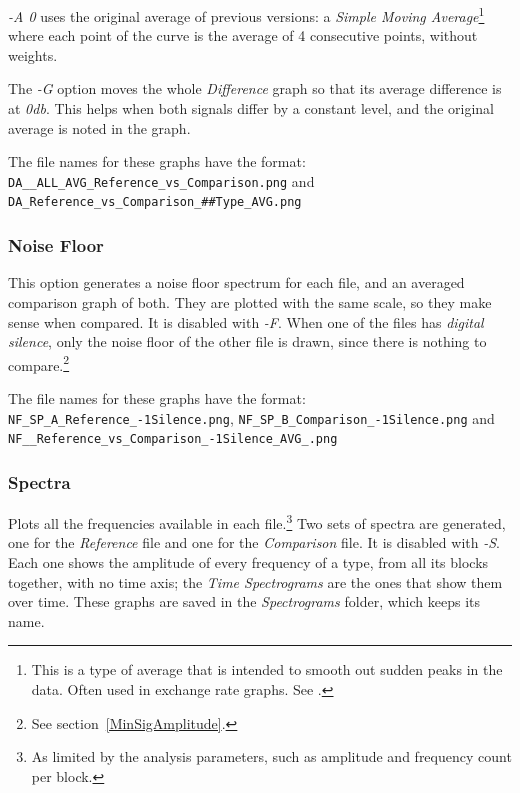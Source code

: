 \documentclass[10pt,a4paper]{report}
\newcommand{\db}[1]{\textit{\mbox{#1\acrshort{db}}}}
\begin{document}
\begin{appendices}
\textit{-A 0} uses the original average of previous versions: a \textit{Simple Moving Average}\footnote{This is a type of average that is intended to smooth out sudden peaks in the data. Often used in exchange rate graphs. See \cite{sma}.} where each point of the curve is the average of 4 consecutive points, without weights.

The \textit{-G} option moves the whole \textit{Difference} graph so that its average difference is at \db{0}. This helps when both signals differ by a constant level, and the original average is noted in the graph.

The file names for these graphs have the format:\\ \nolinkurl{DA__ALL_AVG_Reference_vs_Comparison.png} and \nolinkurl{DA_Reference_vs_Comparison_##Type_AVG.png}

\subsubsection{Noise Floor}

This option generates a noise floor spectrum for each file, and an averaged comparison graph of both. They are plotted with the same scale, so they make sense when compared. It is disabled with \textit{-F}. When one of the files has \textit{digital silence}, only the noise floor of the other file is drawn, since there is nothing to compare.\footnote{See section~\ref{MinSigAmplitude}.}

The file names for these graphs have the format:\\ \nolinkurl{NF_SP_A_Reference_-1Silence.png}, \nolinkurl{NF_SP_B_Comparison_-1Silence.png} and \nolinkurl{NF__Reference_vs_Comparison_-1Silence_AVG_.png}

\subsubsection{Spectra}

Plots all the frequencies available in each file.\footnote{As limited by the analysis parameters, such as amplitude and frequency count per block.} Two sets of spectra are generated, one for the \textit{Reference} file and one for the \textit{Comparison} file. It is disabled with \textit{-S}. Each one shows the amplitude of every frequency of a type, from all its blocks together, with no time axis; the \textit{Time Spectrograms} are the ones that show them over time. These graphs are saved in the \textit{Spectrograms} folder, which keeps its name.


\end{appendices}
\end{document}
